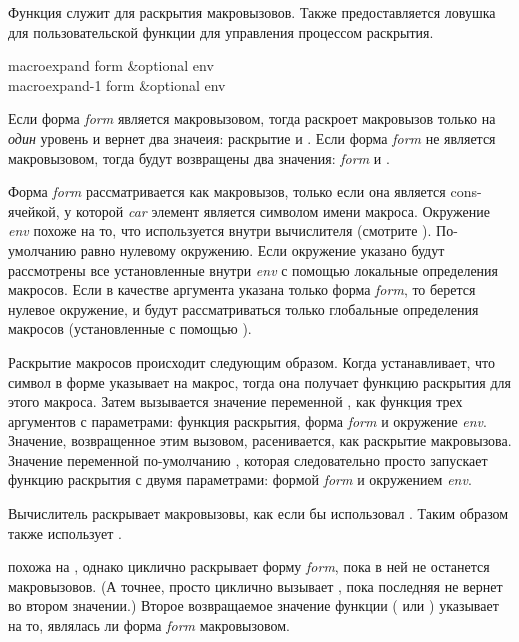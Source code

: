 Функция  служит для раскрытия макровызовов. Также
предоставляется ловушка для пользовательской функции для управления процессом
раскрытия.

\begin{defun}[Function]
macroexpand form &optional env \\
macroexpand-1 form &optional env

Если форма \emph{form} является макровызовом, тогда  раскроет
макровызов только на \emph{один} уровень и вернет два значеия:
раскрытие и .
Если форма \emph{form} не является макровызовом, тогда будут возвращены два
значения: \emph{form} и {\nil}.

Форма \emph{form} рассматривается как макровызов, только если она является
cons-ячейкой, у которой \emph{car} элемент является символом имени макроса. 
Окружение \emph{env} похоже на то, что используется внутри вычислителя (смотрите
). По-умолчанию равно нулевому окружению.
Если окружение указано будут рассмотрены все установленные внутри \emph{env} с
помощью  локальные определения макросов. Если в качестве аргумента
указана только форма \emph{form}, то берется нулевое окружение, и будут
рассматриваться только глобальные определения макросов (установленные с помощью
).

Раскрытие макросов происходит следующим образом. Когда 
устанавливает, что символ в форме указывает на макрос, тогда она получает
функцию раскрытия для этого макроса. Затем вызывается значение переменной
, как функция трех аргументов с параметрами:
функция раскрытия,
форма \emph{form} и
окружение \emph{env}.
Значение, возвращенное этим вызовом, расенивается, как раскрытие макровызова.
Значение переменной  по-умолчанию , которая
следовательно просто запускает функцию раскрытия с двумя параметрами: формой
\emph{form} и окружением \emph{env}.

Вычислитель раскрывает макровызовы, как если бы использовал
. Таким образом  также использует
.

 похожа на , однако циклично раскрывает форму
\emph{form}, пока в ней не останется макровызовов.
(А точнее,  просто циклично вызывает , пока
последняя не вернет {\nil} во втором значении.)
Второе возвращаемое значение функции  ( или {\nil})
указывает на то, являлась ли форма \emph{form} макровызовом.
\end{defun}

